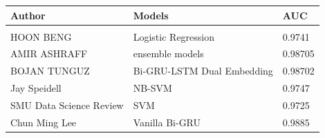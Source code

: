 \documentclass[10.5pt]{article}
\begin{document}
\begin{center}
\centering %
\begin{tabularx}{1\textwidth}{YYY}
\hline\hline %
Author & Models & AUC \vspace{0.1cm}\\
\hline \vspace{0.1cm}\\
HOON BENG \cite{logisticregressionsolution} &  Logistic Regression & 0.9741 \vspace{0.1cm}\\
AMIR ASHRAFF \cite{Forkofensemble_3_blend} & ensemble models & 0.98705 \vspace{0.1cm}\\
BOJAN TUNGUZ \cite{Bi-GRU-LSTMDualEmbedding}  & Bi-GRU-LSTM Dual Embedding & 0.98702 \vspace{0.1cm}\\ 
Jay Speidell \cite{jayspeidellToxicCommentClassification} & NB-SVM & 0.9747 \vspace{0.1cm}\\
SMU Data Science Review \cite{ToxicCommentOnelabel}  & SVM & 0.9725 \vspace{0.1cm}\\ 
Chun Ming Lee \cite{KaggleSOTA}  & Vanilla Bi-GRU & 0.9885 \vspace{0.1cm}\\ 
\hline
\end{tabularx}
\label{tab_art}
\end{center}
\end{document}
